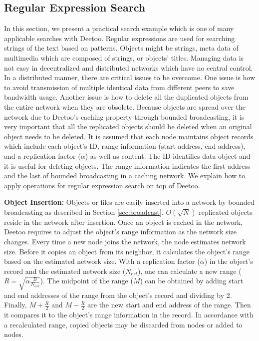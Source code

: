 \documentclass[conference]{IEEEtran}
\begin{document}
\subsection{Regular Expression Search}\label{sec:regex}
In this section, we present a practical search example which is one of many 
applicable searches with Deetoo.   
Regular expressions are used for searching strings of the text based on patterns. 
Objects might be strings, meta data of multimedia which are composed of strings, or 
objects' titles.
Managing data is not easy in decentralized and distributed 
networks which have no central control. In a distributed manner, there are critical issues 
to be overcome.
One issue is how to avoid transmission of multiple identical data 
from different peers to save bandwidth usage. 
Another issue is how to delete all the duplicated objects from the entire 
network when they are obsolete. 
Because objects are spread over the network due to Deetoo's caching property through  
bounded broadcasting, it is very important that all the replicated objects  
should be deleted when an original object needs to be deleted. 
It is assumed that each node maintains object records which include each object's ID, 
range information (start address, end address), and a replication factor ($\alpha$) as well as content.
The ID identifies data object and it is useful for deleting objects. 
The range information indicates the first address and the last 
of bounded broadcasting in a caching network. 
We explain how to apply operations for regular expression search on top of Deetoo.

\textbf{Object Insertion:} Objects or files are easily inserted into a network by 
bounded broadcasting as described in Section \ref{sec:broadcast}. $O(\sqrt{N})$ replicated objects 
reside in the network after insertion. 
Once an object is cached in the network, Deetoo requires to adjust the object's range information 
as the network size changes. Every time a new node joins the network, the node estimates network size. 
Before it copies an object from its neighbor, it calculates the object's range based on the 
estimated network size. With a replication factor ($\alpha$) in the object's record and the 
estimated network size ($N_{est}$), one can calculate a new range ($R=\sqrt{\alpha \frac{B}{N_{est}}}$).
The midpoint of the range ($M$) can be obtained by adding start and end addresses of the 
range from the object's record
and dividing by 2. Finally, $M+\frac{R}{2}$ and $M-\frac{R}{2}$ are the new start and end address 
of the range.
Then it compares it to the object's 
range information in the record. In accordance with a recalculated range, copied objects may be discarded 
from nodes or added to nodes.
\end{document}
